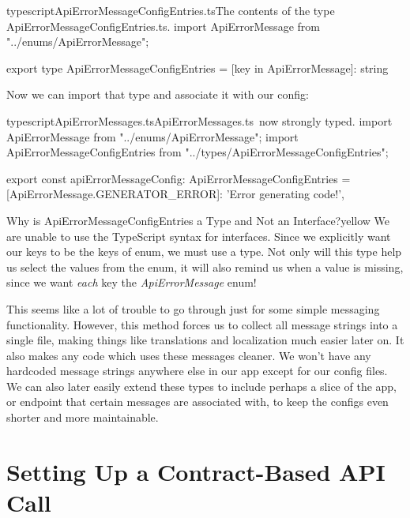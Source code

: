 \documentclass[paper=6in:9in,pagesize=pdftex,headinclude=on,footinclude=on,12pt,twoside]{scrbook}
\begin{document}
\begin{codeInput}{typescript}{ApiErrorMessageConfigEntries.ts}{The contents of the type ApiErrorMessageConfigEntries.ts.}
import ApiErrorMessage from "../enums/ApiErrorMessage";

export type ApiErrorMessageConfigEntries = {
    [key in ApiErrorMessage]: string
}
\end{codeInput}

Now we can import that type and associate it with our config:

\begin{codeInput}{typescript}{ApiErrorMessages.ts}{ApiErrorMessages.ts\, now strongly typed.}
import ApiErrorMessage from "../enums/ApiErrorMessage";
import { ApiErrorMessageConfigEntries } from "../types/ApiErrorMessageConfigEntries";

export const apiErrorMessageConfig: ApiErrorMessageConfigEntries = {
    [ApiErrorMessage.GENERATOR_ERROR]: 'Error generating code!',
}
\end{codeInput}

\begin{highlightBox}{Why is ApiErrorMessageConfigEntries a Type and Not an Interface?}{yellow}{\warning}
We are unable to use the TypeScript  syntax for interfaces. Since we explicitly want our keys to be the keys of  enum, we must use a type. Not only will this type help us select the values from the  enum, it will also remind us when a value is missing, since we want \textit{each} key  the \textit{ApiErrorMessage} enum!
\end{highlightBox}


This seems like a lot of trouble to go through just for some simple messaging functionality. However, this method forces us to collect all message strings into a single file, making things like translations and localization much easier later on. It also makes any code which uses these messages cleaner. We won't have any hardcoded message strings anywhere else in our app except for our config files. We can also later easily extend these types to include perhaps a slice of the app, or endpoint that certain messages are associated with, to keep the configs even shorter and more maintainable.

\section{Setting Up a Contract-Based API Call}\label{contract-based-api}
\end{document}
